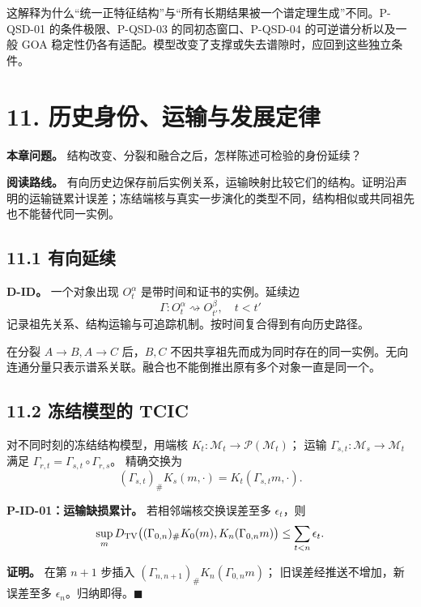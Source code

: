 \documentclass[
  11pt,
  oneside]{book}
\begin{document}
这解释为什么``统一正特征结构''与``所有长期结果被一个谱定理生成''不同。P-QSD-01 的条件极限、P-QSD-03 的同初态窗口、P-QSD-04 的可逆谱分析以及一般 GOA 稳定性仍各有适配。模型改变了支撑或失去谱隙时，应回到这些独立条件。

\chapter{11. 历史身份、运输与发展定律}\label{ch-11}

\textbf{本章问题。} 结构改变、分裂和融合之后，怎样陈述可检验的身份延续？

\textbf{阅读路线。} 有向历史边保存前后实例关系，运输映射比较它们的结构。证明沿声明的运输链累计误差；冻结端核与真实一步演化的类型不同，结构相似或共同祖先也不能替代同一实例。

\section{11.1 有向延续}\label{ux6709ux5411ux5ef6ux7eed}

\textbf{D-ID。} 一个对象出现 \(O_t^\alpha\) 是带时间和证书的实例。延续边 \[\Gamma:O_t^\alpha\rightsquigarrow O_{t'}^\beta,\quad t<t'\] 记录祖先关系、结构运输与可追踪机制。按时间复合得到有向历史路径。

在分裂 \(A\to B,A\to C\) 后，\(B,C\) 不因共享祖先而成为同时存在的同一实例。无向连通分量只表示谱系关联。融合也不能倒推出原有多个对象一直是同一个。

\section{11.2 冻结模型的 TCIC}\label{ux51bbux7ed3ux6a21ux578bux7684-tcic}

对不同时刻的冻结结构模型，用端核 \(K_t:\mathcal M_t\to\mathcal P(\mathcal M_t)\)； 运输 \(\Gamma_{s,t}:\mathcal M_s\to\mathcal M_t\) 满足 \(\Gamma_{r,t}=\Gamma_{s,t}\circ\Gamma_{r,s}\)。 精确交换为 \[(\Gamma_{s,t})_\#K_s(m,\cdot)=K_t(\Gamma_{s,t}m,\cdot).\]

\hypertarget{p-id-01}{}\label{p-id-01}

\textbf{P-ID-01：运输缺损累计。} 若相邻端核交换误差至多 \(\epsilon_t\)，则 \[\sup_mD_{\rm TV}\bigl((\Gamma_{0,n})_\#K_0(m),
K_n(\Gamma_{0,n}m)\bigr)\le\sum_{t<n}\epsilon_t.\]

\textbf{证明。} 在第 \(n+1\) 步插入 \((\Gamma_{n,n+1})_\#K_n(\Gamma_{0,n}m)\)； 旧误差经推送不增加，新误差至多 \(\epsilon_n\)。归纳即得。\(\blacksquare\)
\end{document}
